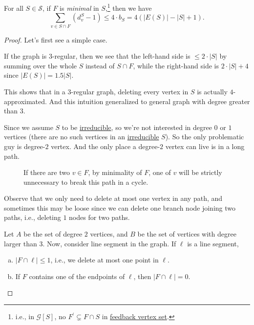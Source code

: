 \begin{lemma}\label{lma:feedback-vertex-set-2}
	For all \(S\in \mathcal{S} \), if \(F\) is \emph{minimal} in \(S\),\footnote{i.e., in \(\mathcal{G} [S]\), no \(F^\prime \subsetneq F \cap S\) in \hyperref[prb:feedback-vertex-set]{feedback vertex set}.} then we have
	\[
		\sum_{v\in S \cap F}(d_{v} ^S - 1) \leq 4\cdot b_S = 4(\left\vert E(S) \right\vert - \left\vert S \right\vert + 1).
	\]
\end{lemma}
\begin{proof}
	Let's first see a simple case.
	\begin{intuition}
		If the graph is \(3\)-regular, then we see that the left-hand side is \(\leq 2\cdot \left\vert S \right\vert \) by summing over the whole \(S\) instead of \(S\cap F\), while the right-hand side is \(2\cdot \left\vert S \right\vert + 4\) since \(\left\vert E(S) \right\vert = 1.5 \left\vert S \right\vert \).

		This shows that in a \(3\)-regular graph, deleting every vertex in \(S\) is actually \(4\)-approximated. And this intuition generalized to general graph with degree greater than \(3\).
	\end{intuition}

	Since we assume \(S\) to be \hyperref[def:irreducible]{irreducible}, so we're not interested in degree \(0\) or \(1\) vertices (there are no such vertices in an \hyperref[def:irreducible]{irreducible} \(S\)). So the only problematic guy is degree-\(2\) vertex. And the only place a degree-\(2\) vertex can live is in a long path.

	\begin{figure}[H]
		\centering
		\caption{If there are two \(v\in F\), by minimality of \(F\), one of \(v\) will be strictly unnecessary to break this path in a cycle.}
		\label{fig:FBV-path}
	\end{figure}
	\begin{note}
		Observe that we only need to delete at most one vertex in any path, and sometimes this may be loose since we can delete one branch node joining two paths, i.e., deleting \(1\) nodes for two paths.
	\end{note}

	Let \(A\) be the set of degree \(2\) vertices, and \(B\) be the set of vertices with degree larger than \(3\). Now, consider line segment in the graph. If \(\ell \) is a line segment,
	\begin{enumerate}[(a)]
		\item \(\left\vert F \cap  \ell  \right\vert \leq 1\), i.e., we delete at most one point in \(\ell \).
		\item If \(F\) contains one of the endpoints of \(\ell \), then \(\left\vert F \cap \ell  \right\vert = 0\).
	\end{enumerate}


\end{proof}
